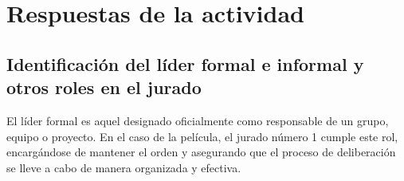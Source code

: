 \documentclass{article}
\begin{document}
    
    
    

\section{Respuestas de la actividad }
\subsection{Identificación del líder formal e informal y otros roles en el jurado}

El líder formal es aquel designado oficialmente como responsable de un grupo, equipo o proyecto. En el caso de la película, el jurado número 1 cumple este rol, encargándose de mantener el orden y asegurando que el proceso de deliberación se lleve a cabo de manera organizada y efectiva. 
\end{document}
